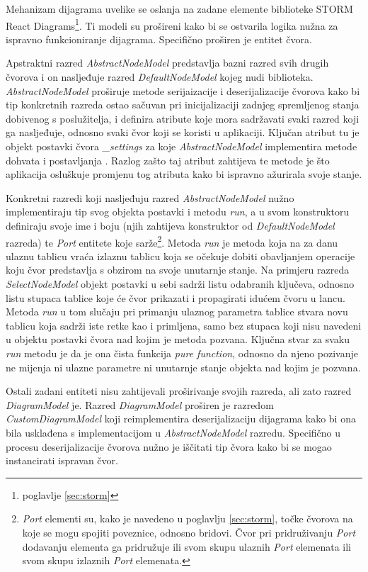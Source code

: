 \documentclass[times, utf8, diplomski, numeric]{fer}
\begin{document}
Mehanizam dijagrama uvelike se oslanja na zadane  elemente biblioteke STORM React Diagrams\footnote{poglavlje \ref{sec:storm}}.
Ti modeli su prošireni kako bi se ostvarila logika nužna za ispravno funkcioniranje dijagrama.
Specifično proširen je entitet čvora.

Apstraktni razred \emph{AbstractNodeModel} predstavlja bazni razred svih drugih čvorova i on nasljeđuje razred \emph{DefaultNodeModel} kojeg nudi biblioteka.
\emph{AbstractNodeModel} proširuje metode serijaizacije i deserijalizacije čvorova kako bi tip konkretnih razreda ostao sačuvan pri inicijalizaciji zadnjeg spremljenog stanja dobivenog s poslužitelja, i definira atribute koje mora sadržavati svaki razred koji ga nasljeđuje, odnosno svaki čvor koji se koristi u aplikaciji.
Ključan atribut tu je objekt postavki čvora \emph{\_settings} za koje \emph{AbstractNodeModel} implementira metode dohvata  i postavljanja .
Razlog zašto taj atribut zahtijeva te metode je što aplikacija osluškuje promjenu tog atributa kako bi ispravno ažurirala svoje stanje.

Konkretni razredi koji nasljeđuju razred \emph{AbstractNodeModel} nužno implementiraju tip svog objekta postavki i metodu \emph{run}, a u svom konstruktoru definiraju svoje ime i boju (njih zahtijeva konstruktor od \emph{DefaultNodeModel} razreda) te \emph{Port} entitete koje sarže\footnote{
    \emph{Port} elementi su, kako je navedeno u poglavlju \ref{sec:storm}, točke čvorova na koje se mogu spojiti poveznice, odnosno bridovi.
    Čvor pri pridruživanju \emph{Port} dodavanju elementa ga pridružuje ili svom skupu ulaznih \emph{Port} elemenata ili svom skupu izlaznih \emph{Port} elemenata.
}.
Metoda \emph{run} je metoda koja na za danu ulaznu tablicu vraća izlaznu tablicu koja se očekuje dobiti obavljanjem operacije koju čvor predstavlja s obzirom na svoje unutarnje stanje.
Na primjeru razreda \emph{SelectNodeModel} objekt postavki u sebi sadrži listu odabranih ključeva, odnosno listu stupaca tablice koje će čvor prikazati i propagirati idućem čvoru u lancu.
Metoda \emph{run} u tom slučaju pri primanju ulaznog parametra tablice stvara novu tablicu koja sadrži iste retke kao i primljena, samo bez stupaca koji nisu navedeni u objektu postavki čvora nad kojim je metoda pozvana. 
Ključna stvar za svaku \emph{run} metodu je da je ona čista funkcija \emph{pure function}, odnosno da njeno pozivanje ne mijenja ni ulazne parametre ni unutarnje stanje objekta nad kojim je pozvana.

Ostali zadani  entiteti nisu zahtijevali proširivanje svojih razreda, ali zato razred \emph{DiagramModel} je.
Razred \emph{DiagramModel} proširen je razredom \emph{CustomDiagramModel} koji reimplementira deserijalizaciju dijagrama kako bi ona bila usklađena s implementacijom u \emph{AbstractNodeModel} razredu.
Specifično u procesu deserijalizacije čvorova nužno je iščitati tip čvora kako bi se mogao instancirati ispravan čvor.
\end{document}
